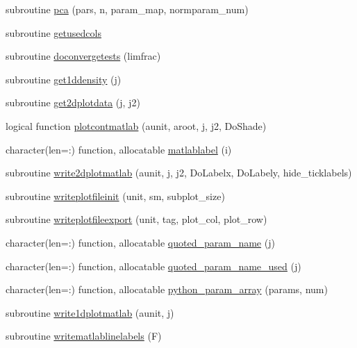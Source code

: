 \begin{DoxyCompactItemize}
\item 
subroutine \mbox{\hyperlink{namespacemcsamples_a72e8a848ae68643f3449e12e33334870}{pca}} (pars, n, param\+\_\+map, normparam\+\_\+num)
\item 
subroutine \mbox{\hyperlink{namespacemcsamples_a4664c132197f4ef65fa541baac30f0f2}{getusedcols}}
\item 
subroutine \mbox{\hyperlink{namespacemcsamples_a4a0eac91a04d742f776ae4f8f15d919c}{doconvergetests}} (limfrac)
\item 
subroutine \mbox{\hyperlink{namespacemcsamples_a9bbfd241a96107124f0af5ef8d0fbe61}{get1ddensity}} (j)
\item 
subroutine \mbox{\hyperlink{namespacemcsamples_a67c86279d2ba781324578c13807fa812}{get2dplotdata}} (j, j2)
\item 
logical function \mbox{\hyperlink{namespacemcsamples_a12e5ebfb72dd60020dd1aef9afa7ad2e}{plotcontmatlab}} (aunit, aroot, j, j2, Do\+Shade)
\item 
character(len=\+:) function, allocatable \mbox{\hyperlink{namespacemcsamples_ab0762a08afdb1f7f972b966091ef0918}{matlablabel}} (i)
\item 
subroutine \mbox{\hyperlink{namespacemcsamples_a6ac9a19d5b3622b2a2dea19257a37c36}{write2dplotmatlab}} (aunit, j, j2, Do\+Labelx, Do\+Labely, hide\+\_\+ticklabels)
\item 
subroutine \mbox{\hyperlink{namespacemcsamples_a22e27e5c21abdb2a3d8cf2816d2f8acb}{writeplotfileinit}} (unit, sm, subplot\+\_\+size)
\item 
subroutine \mbox{\hyperlink{namespacemcsamples_aeb1af08402647e8ef9e1d8f97e774e3a}{writeplotfileexport}} (unit, tag, plot\+\_\+col, plot\+\_\+row)
\item 
character(len=\+:) function, allocatable \mbox{\hyperlink{namespacemcsamples_a1084f1fea1eddc1385237c666e34115b}{quoted\+\_\+param\+\_\+name}} (j)
\item 
character(len=\+:) function, allocatable \mbox{\hyperlink{namespacemcsamples_aaed4d229224d51b97154b233f072fae9}{quoted\+\_\+param\+\_\+name\+\_\+used}} (j)
\item 
character(len=\+:) function, allocatable \mbox{\hyperlink{namespacemcsamples_a61ce07e713757fee14a963684c25fe12}{python\+\_\+param\+\_\+array}} (params, num)
\item 
subroutine \mbox{\hyperlink{namespacemcsamples_a0a903a19ac6139be1cc98a32218ec801}{write1dplotmatlab}} (aunit, j)
\item 
subroutine \mbox{\hyperlink{namespacemcsamples_a7fb178ee92298048973cca975336489e}{writematlablinelabels}} (F)

\end{DoxyCompactItemize}
